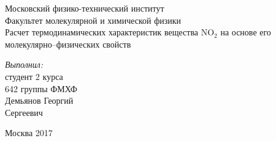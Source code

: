 \begin{titlepage}
\begin{center} 
 
\large Московский физико-технический институт\\
Факультет молекулярной и химической физики\\
\vspace{7cm}
\huge Расчет термодинамических характеристик вещества NO$_2$ на основе его молекулярно--физических свойств
\end{center} 

\vspace{7.5cm}
{\par \raggedleft \large \emph{Выполнил:}\\ студент 2 курса\\ 642 группы ФМХФ\\ Демьянов Георгий\\ Сергеевич \par}
\begin{center}
\vfill Москва 2017
\end{center}
\end{titlepage}
\newpage
\setcounter{page}{2}
